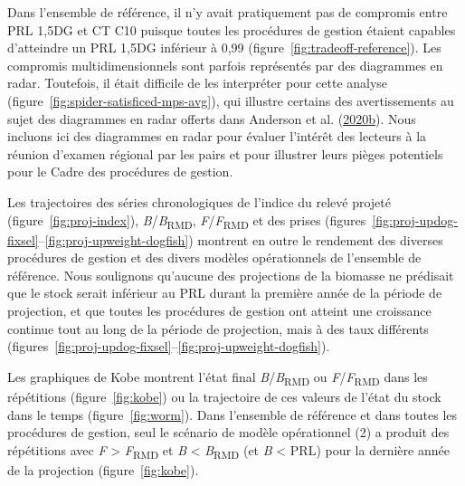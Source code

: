 \documentclass[french,11pt]{book}
\begin{document}
Dans l'ensemble de référence, il n'y avait pratiquement pas de compromis entre PRL 1,5DG et CT C10 puisque toutes les procédures de gestion étaient capables d'atteindre un PRL 1,5DG inférieur à 0,99 (figure~\ref{fig:tradeoff-reference}). Les compromis multidimensionnels sont parfois représentés par des diagrammes en radar. Toutefois, il était difficile de les interpréter pour cette analyse (figure~\ref{fig:spider-satisficed-mps-avg}), qui illustre certains des avertissements au sujet des diagrammes en radar offerts dans Anderson et al. (\protect\hyperlink{ref-anderson2020gfmp}{2020}\protect\hyperlink{ref-anderson2020gfmp}{b}). Nous incluons ici des diagrammes en radar pour évaluer l'intérêt des lecteurs à la réunion d'examen régional par les pairs et pour illustrer leurs pièges potentiels pour le Cadre des procédures de gestion.

Les trajectoires des séries chronologiques de l'indice du relevé projeté (figure~\ref{fig:proj-index}), \emph{B}/\emph{B}\textsubscript{RMD}, \emph{F}/\emph{F}\textsubscript{RMD} et des prises (figures~\ref{fig:proj-updog-fixsel}--\ref{fig:proj-upweight-dogfish}) montrent en outre le rendement des diverses procédures de gestion et des divers modèles opérationnels de l'ensemble de référence. Nous soulignons qu'aucune des projections de la biomasse ne prédisait que le stock serait inférieur au PRL durant la première année de la période de projection, et que toutes les procédures de gestion ont atteint une croissance continue tout au long de la période de projection, mais à des taux différents (figures~\ref{fig:proj-updog-fixsel}--\ref{fig:proj-upweight-dogfish}).

Les graphiques de Kobe montrent l'état final \emph{B}/\emph{B}\textsubscript{RMD} ou \emph{F}/\emph{F}\textsubscript{RMD} dans les répétitions (figure~\ref{fig:kobe}) ou la trajectoire de ces valeurs de l'état du stock dans le temps (figure~\ref{fig:worm}). Dans l'ensemble de référence et dans toutes les procédures de gestion, seul le scénario de modèle opérationnel (2) a produit des répétitions avec \emph{F} \textgreater{} \emph{F}\textsubscript{RMD} et \emph{B} \textless{} \emph{B}\textsubscript{RMD} (et \emph{B} \textless{} PRL) pour la dernière année de la projection (figure~\ref{fig:kobe}).
\end{document}
